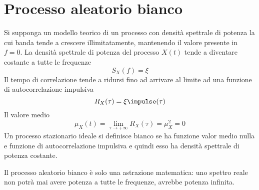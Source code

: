 \section{Processo aleatorio bianco}
Si supponga un modello teorico di un processo con densità spettrale di potenza la cui banda tende a crescere illimitatamente, mantenendo il valore presente in $f=0$. La densità spettrale di potenza del processo $X(t)$ tende a diventare costante a tutte le frequenze
\[
	S_X(f)=\xi
\]
Il tempo di correlazione tende a ridursi fino ad arrivare al limite ad una funzione di autocorrelazione impulsiva
\[
	R_X(\tau)=\xi\impulse(\tau)
\]
Il valore medio
\[
	\mu_X(t)=\lim\limits_{\tau\to +\infty}R_X(\tau)=\mu^2_X=0
\]
Un processo stazionario ideale si definisce bianco se ha funzione valor medio nulla e funzione di autocorrelazione impulsiva e quindi esso ha densità spettrale di potenza costante.

\begin{nota}
	Il processo aleatorio bianco è solo una astrazione matematica: uno spettro reale non potrà mai avere potenza a tutte le frequenze, avrebbe potenza infinita.
\end{nota}

